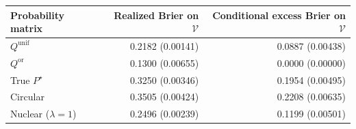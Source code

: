 \begin{tabular}{lrr}
\toprule
Probability matrix & Realized Brier on $\mathcal{V}$ & Conditional excess Brier on $\mathcal{V}$ \\
\midrule
$Q^{\mathrm{unif}}$ & 0.2182 (0.00141) & 0.0887 (0.00438) \\
$Q^{\mathrm{or}}$ & 0.1300 (0.00655) & 0.0000 (0.00000) \\
True $P^\star$ & 0.3250 (0.00346) & 0.1954 (0.00495) \\
Circular & 0.3505 (0.00424) & 0.2208 (0.00635) \\
Nuclear ($\lambda=1$) & 0.2496 (0.00239) & 0.1199 (0.00501) \\
\bottomrule
\end{tabular}
